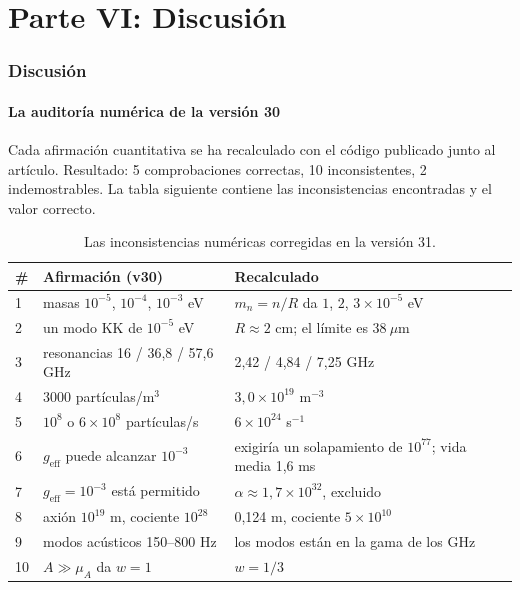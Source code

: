 \part*{Parte VI: Discusión}

\section{Discusión}
\subsection{La auditoría numérica de la versión 30}
Cada afirmación cuantitativa se ha recalculado con el código publicado junto al artículo. Resultado: 5 comprobaciones correctas, 10 inconsistentes, 2 indemostrables. La tabla siguiente contiene las inconsistencias encontradas y el valor correcto.

\begin{table}[H]
\centering
\small
\begin{tabular}{@{}p{0.5cm}p{6.2cm}p{5.2cm}@{}}
\toprule
\# & \textbf{Afirmación (v30)} & \textbf{Recalculado} \\ \midrule
1 & masas $10^{-5}$, $10^{-4}$, $10^{-3}$ eV & $m_n = n/R$ da $1$, $2$, $3 \times 10^{-5}$ eV \\
2 & un modo KK de $10^{-5}$ eV & $R \approx 2$ cm; el límite es $38\ \mu$m \\
3 & resonancias 16 / 36,8 / 57,6 GHz & 2,42 / 4,84 / 7,25 GHz \\
4 & 3000 partículas/m$^3$ & $3,0\times10^{19}$ m$^{-3}$ \\
5 & $10^8$ o $6\times10^8$ partículas/s & $6\times10^{24}$ s$^{-1}$ \\
6 & $g_{\text{eff}}$ puede alcanzar $10^{-3}$ & exigiría un solapamiento de $10^{77}$; vida media 1,6 ms \\
7 & $g_{\text{eff}} = 10^{-3}$ está permitido & $\alpha \approx 1,7\times10^{32}$, excluido \\
8 & axión $10^{19}$ m, cociente $10^{28}$ & 0,124 m, cociente $5\times10^{10}$ \\
9 & modos acústicos 150--800 Hz & los modos están en la gama de los GHz \\
10 & $A \gg \mu_A$ da $w = 1$ & $w = 1/3$ \\ \bottomrule
\end{tabular}
\caption{Las inconsistencias numéricas corregidas en la versión 31.}
\label{tab:audit}
\end{table}

